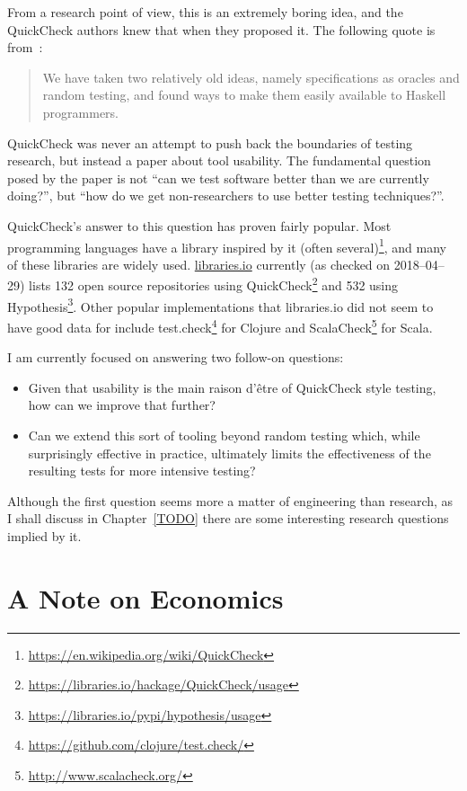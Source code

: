 From a research point of view,
this is an extremely boring idea,
and the QuickCheck authors knew that when they proposed it.
The following quote is from~\cite{DBLP:conf/icfp/ClaessenH00}:

\begin{quote}
We have taken two relatively old ideas, namely specifications
as oracles and random testing, and found ways to make
them easily available to Haskell programmers.
\end{quote}

QuickCheck was never an attempt to push back the boundaries of testing research,
but instead a paper about tool usability.
The fundamental question posed by the paper is not ``can we test software better than we are currently doing?'',
but ``how do we get non-researchers to use better testing techniques?''.

QuickCheck's answer to this question has proven fairly popular.
Most programming languages have a library inspired by it (often several)\footnote{\url{https://en.wikipedia.org/wiki/QuickCheck}},
and many of these libraries are widely used.
\href{http://libraries.io}{libraries.io} currently (as checked on 2018--04--29) lists 132 open source repositories using QuickCheck\footnote{\url{https://libraries.io/hackage/QuickCheck/usage}} and 532 using Hypothesis\footnote{\url{https://libraries.io/pypi/hypothesis/usage}}.
Other popular implementations that libraries.io did not seem to have good data for include test.check\footnote{\url{https://github.com/clojure/test.check/}} for Clojure and ScalaCheck\footnote{\url{http://www.scalacheck.org/}} for Scala.

I am currently focused on answering two follow-on questions:

\begin{itemize}
\item Given that usability is the main raison d'être of QuickCheck style testing,
how can we improve that further?
\item Can we extend this sort of tooling beyond random testing which,
while surprisingly effective in practice,
ultimately limits the effectiveness of the resulting tests for more intensive testing?
\end{itemize}

Although the first question seems more a matter of engineering than research,
as I shall discuss in Chapter~\ref{TODO} there are some interesting research questions implied by it.

\chapter{A Note on Economics}

